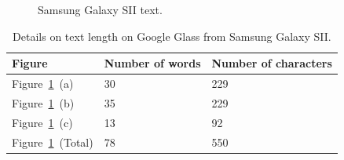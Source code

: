 	\begin{figure}[H]%
		\centering
   		 \qquad
   		 \qquad
   		 \qquad
		\caption{Samsung Galaxy SII text.}
		\label{glassTestTextLengthS2Text}
	\end{figure}

	\begin{table}[ht!]
    		\caption{Details on text length on Google Glass from Samsung Galaxy SII.} \label{tab:glassTestTextLengthS2TextTable}
		\centering \begin{tabularx}{\textwidth}{l|X|X} \hline
		\textbf{Figure} & \textbf{Number of words} & \textbf{Number of characters} \\ \hline \hline
       
		Figure~\ref{glassTestTextLengthS2Text}~(a)	&30	&229	\\ \hline
		Figure~\ref{glassTestTextLengthS2Text}~(b)	&35	&229	\\ \hline
		Figure~\ref{glassTestTextLengthS2Text}~(c)	&13	&92	\\ \hline
		Figure~\ref{glassTestTextLengthS2Text}~(Total)	&78	&550	\\ \hline
		
		\end{tabularx}
	\end{table}

